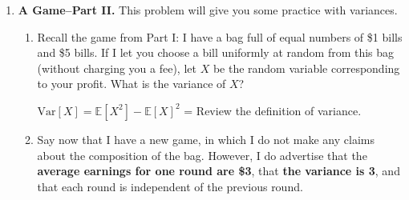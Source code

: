 \documentclass[11pt,preview]{standalone} %
\newcommand{\E}{\mathbb{E}}
\newcommand{\Var}{\text{Var}}
\begin{document}
\begin{enumerate}
\begin{enumerate}
\begin{Freeform}{0}
\Hint Review the definition of expectation and linearity of expectation.
\end{Freeform}
\item Given the pay scheme above (\$2.50 to draw from the first bag, \$15.50 to draw from the second bag) Which of the following actions gives the maximum expected profit?
\begin{Multi}
\begin{enumerate}
\TrueChoice \item Drawing from the first bag only.
\FalseChoice \item Drawing from the second bag only.
\FalseChoice \item Drawing from both bags.
\FalseChoice \item Drawing from neither bag.
\end{enumerate}
\end{Multi}
\item As the designer of this game, I want your expected profit to be net negative. I have told you that the proportions of \$1 and \$5 bills in the bag are the same. However, I could lie to you and rig the game so that if I charge you \$2.50, your expected profit for drawing from the first bag is negative. What percentage of bills in the bag should be \$1 bils in order to make your expected profit $-\$1$ (round up to the nearest percent)?
\begin{Freeform}{88}
\% of \$1s? = 
\Hint Review the definition of expectation.
\end{Freeform}
\end{enumerate}


\item {\bf A Game--Part II.} This problem will give you some practice with variances. 
\begin{enumerate}
\item Recall the game from Part I: I have a bag full of equal numbers of \$1 bills and \$5 bills. If I let you choose a bill uniformly at random from this bag (without charging you a fee), let $X$ be the random variable corresponding to your profit. What is the variance of $X$?
\begin{Freeform}{4}
$\Var[X] = \E[X^2] - \E[X]^2$ = 
\Hint Review the definition of variance.
\end{Freeform}
\item Say now that I have a new game, in which I do not make any claims about the composition of the bag. However, I do advertise that the {\bf average earnings for one round are \$3}, that {\bf the variance is 3}, and that each round is independent of the previous round. 


\end{enumerate}
\end{enumerate}
\end{document}
